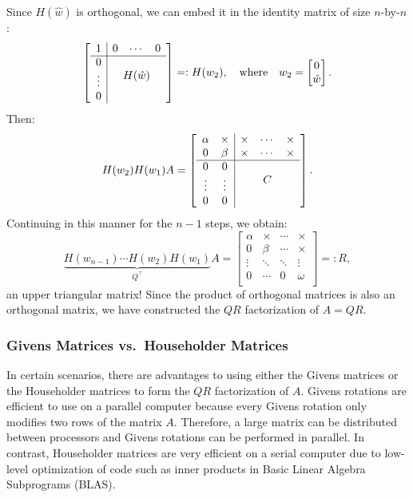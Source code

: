 Since $H(\hat{w})$ is orthogonal, we can embed it in the identity matrix of size $n$-by-$n$:
\[
\left[\begin{array}{c|ccc} 1 & 0 & \cdots & 0\\ \hline 0 & \multicolumn{3}{c}{\multirow{3}{*}{$H(\hat{w})$}}\\ \vdots\\0\\ \end{array}\right] =: H(w_2),\quad{\rm where}\quad w_2 = \begin{bmatrix} 0\\\hat{w}\end{bmatrix}.
\]
Then:
\[
H(w_2)H(w_1)A = \left[\begin{array}{cc|ccc} \alpha & \times & \times & \cdots & \times\\ 0 & \beta & \times & \cdots & \times\\ \hline 0 & 0 & \multicolumn{3}{c}{\multirow{3}{*}{$C$}}\\ \vdots &\vdots\\0 & 0\\ \end{array}\right].
\]
Continuing in this manner for the $n-1$ steps, we obtain:
\begin{equation}
\underbrace{H(w_{n-1})\cdots H(w_2)H(w_1)}_{Q^\top}A = 
\begin{bmatrix} \alpha & \times & \cdots & \times\\
0 & \beta & \cdots & \times\\
\vdots & \ddots & \ddots & \vdots\\
0 & \cdots & 0 & \omega\\
\end{bmatrix} =: R,
\end{equation}
an upper triangular matrix! Since the product of orthogonal matrices is also an orthogonal matrix, we have constructed the $QR$ factorization of $A = QR$.

\subsubsection{Givens Matrices vs.~Householder Matrices}

In certain scenarios, there are advantages to using either the Givens matrices or the Householder matrices to form the $QR$ factorization of $A$. Givens rotations are efficient to use on a parallel computer because every Givens rotation only modifies two rows of the matrix $A$. Therefore, a large matrix can be distributed between processors and Givens rotations can be performed in parallel. In contrast, Householder matrices are very efficient on a serial computer due to low-level optimization of code such as inner products in Basic Linear Algebra Subprograms (BLAS).

